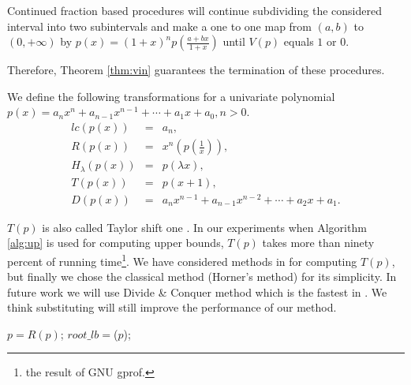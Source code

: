   Continued fraction based procedures will continue subdividing the considered interval into two subintervals and make a one to one map from $(a,b)$ to $(0,+\infty)$ by $  p(x) = (1+x)^{n}p(\frac{a+bx}{1+x})$ until $V(p)$ equals $1$ or $0$. 
  
  
    Therefore, Theorem \ref{thm:vin} guarantees the termination of these  procedures.

\begin{definition}  We define the following transformations for a univariate polynomial $p(x)=a_nx^n+a_{n-1}x^{n-1}+\cdots+a_1x+a_0,n>0$.
  \begin{eqnarray*}
  lc(p(x))&=&a_n,\\
  R(p(x))&=&x^n(p(\frac{1}{x})),\\
  H_\lambda(p(x))&=&p(\lambda x),\\
  T(p(x))&=&p(x+1), \\
  D(p(x))&=&a_nx^{n-1}+a_{n-1}x^{n-2}+\cdots+a_2x+a_1.
  \end{eqnarray*}
\end{definition}

$T(p)$  is also called	Taylor shift one \cite{ger04,joh05}. In our experiments when Algorithm \ref{alg:up} is used for computing upper bounds, $T(p)$  takes  more than
ninety percent of running time\footnote{the result of  GNU gprof.}.  We have considered methods in \cite{ger04} for computing $T(p)$, but   finally we chose the  classical
method (Horner's method) for its simplicity. In future work we will use Divide \& Conquer method which is the fastest in \cite{ger04}. We think  substituting
will still improve the performance of our method.



\begin{algorithm}
\caption{\lb \label{alg:lb}}
\DontPrintSemicolon
{}
$p=R(p)$;\;
$root\_lb=$\up($p$); 
\end{algorithm}


